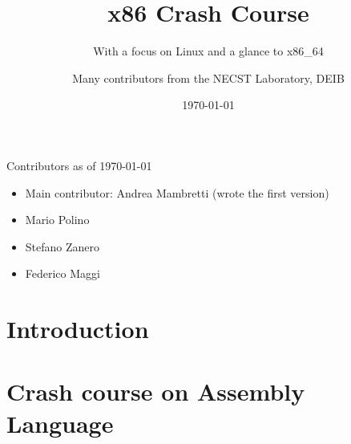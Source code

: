 \documentclass[]{beamer}
\title{x86 Crash Course}
\subtitle{With a focus on Linux and a glance to x86\_64}
\author[NECSTLab]{Many contributors from the NECST Laboratory, DEIB}
\institute{Politecnico di Milano}
\date{\today}
\begin{document}
\begin{frame}
  \titlepage
\end{frame}

\begin{frame}{Contributors as of \today}
  \begin{itemize}
  \item Main contributor: Andrea Mambretti (wrote the first version)
  \item Mario Polino
  \item Stefano Zanero
  \item Federico Maggi
  \end{itemize}
\end{frame}

\section{Introduction}

\begin{frame}
  \tableofcontents
\end{frame}

\section{Crash course on Assembly Language}
\end{document}
